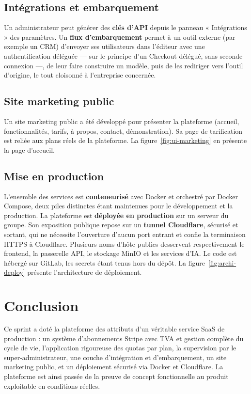 
\subsection{Intégrations et embarquement}
Un administrateur peut générer des \textbf{clés d'API} depuis le panneau
« Intégrations » des paramètres. Un \textbf{flux d'embarquement} permet à un
outil externe (par exemple un CRM) d'envoyer ses utilisateurs dans l'éditeur
avec une authentification déléguée — sur le principe d'un Checkout délégué,
sans seconde connexion —, de leur faire construire un modèle, puis de les
rediriger vers l'outil d'origine, le tout cloisonné à l'entreprise
concernée.

\subsection{Site marketing public}
Un site marketing public a été développé pour présenter la plateforme
(accueil, fonctionnalités, tarifs, à propos, contact, démonstration). Sa page
de tarification est reliée aux plans réels de la plateforme. La
figure~\ref{fig:ui-marketing} en présente la page d'accueil.


\subsection{Mise en production}
L'ensemble des services est \textbf{conteneurisé} avec Docker et orchestré
par Docker Compose, deux piles distinctes étant maintenues pour le
développement et la production. La plateforme est \textbf{déployée en
production} sur un serveur du groupe. Son exposition publique repose sur un
\textbf{tunnel Cloudflare}, sécurisé et sortant, qui ne nécessite l'ouverture
d'aucun port entrant et confie la terminaison HTTPS à Cloudflare. Plusieurs
noms d'hôte publics desservent respectivement le frontend, la passerelle API,
le stockage MinIO et les services d'IA. Le code est hébergé sur GitLab, les
secrets étant tenus hors du dépôt. La figure~\ref{fig:archi-deploy} présente
l'architecture de déploiement.


\section*{Conclusion}
Ce sprint a doté la plateforme des attributs d'un véritable service SaaS de
production : un système d'abonnements Stripe avec TVA et gestion complète du
cycle de vie, l'application rigoureuse des quotas par plan, la supervision
par le super-administrateur, une couche d'intégration et d'embarquement, un
site marketing public, et un déploiement sécurisé via Docker et Cloudflare.
La plateforme est ainsi passée de la preuve de concept fonctionnelle au
produit exploitable en conditions réelles.
